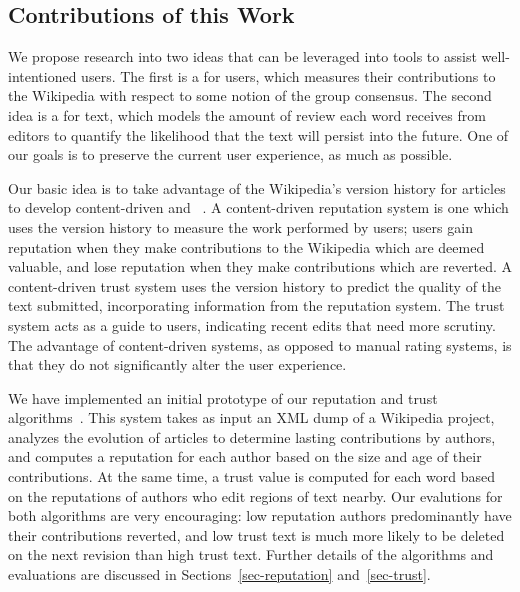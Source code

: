 \subsection{Contributions of this Work}

We propose research into two ideas that can be leveraged
into tools to assist well-intentioned users.
The first is a  for users, which measures
their contributions to the Wikipedia with respect to some
notion of the group consensus.
The second idea is a  for text,
which models the amount of review each word receives from editors
to quantify the likelihood that the text will persist
into the future.
One of our goals is to preserve the current user experience,
as much as possible.


Our basic idea is to take advantage of the Wikipedia's version history
for articles to develop content-driven 
and ~\cite{WikiMTWtrust06,McGuinness06,www07,WikiTrust2008}.
A content-driven reputation system is one which uses
the version history to measure the work performed by users;
users gain reputation when they make
contributions to the Wikipedia which are deemed valuable, and lose reputation
when they make contributions which are reverted.
A content-driven trust system uses the version history
to predict the quality of the text submitted, incorporating
information from the reputation system.
The trust system acts as a guide to users,
indicating recent edits that need more scrutiny.
The advantage of content-driven systems,
as opposed to manual rating systems, is that they do
not significantly alter the user experience.

We have implemented an initial prototype of our reputation and
trust algorithms~\cite{www07,WikiTrust2008}.
This system takes as input an XML dump of a Wikipedia project,
analyzes the evolution of articles to determine lasting
contributions by authors, and computes a reputation for
each author based on the size and age of their contributions.
At the same time, a trust value is computed for each word
based on the reputations of authors who edit
regions of text nearby.
Our evalutions for both algorithms are very encouraging:
low reputation authors predominantly have their contributions
reverted, and low trust text is much more likely to be
deleted on the next revision than high trust text.
Further details of the algorithms and evaluations
are discussed in Sections~\ref{sec-reputation}
and~\ref{sec-trust}.

